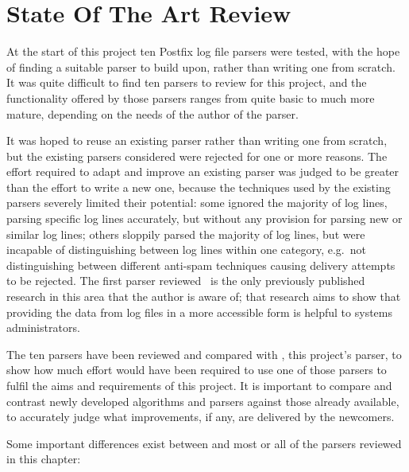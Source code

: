 \chapter{State Of The Art Review}

\label{state of the art review}

At the start of this project ten Postfix log file parsers were tested, with
the hope of finding a suitable parser to build upon, rather than writing
one from scratch.  It was quite difficult to find ten parsers to review for
this project, and the functionality offered by those parsers ranges from
quite basic to much more mature, depending on the needs of the author of
the parser.

It was hoped to reuse an existing parser rather than writing one from
scratch, but the existing parsers considered were rejected for one or more
reasons.  The effort required to adapt and improve an existing parser was
judged to be greater than the effort to write a new one, because the
techniques used by the existing parsers severely limited their potential:
some ignored the majority of log lines, parsing specific log lines
accurately, but without any provision for parsing new or similar log lines;
others sloppily parsed the majority of log lines, but were incapable of
distinguishing between log lines within one category, e.g.\ not
distinguishing between different anti-spam techniques causing delivery
attempts to be rejected.  The first parser
reviewed~\cite{log-mail-analyser} is the only previously published research
in this area that the author is aware of; that research aims to show that
providing the data from log files in a more accessible form is helpful to
systems administrators.

The ten parsers have been reviewed and compared with \parsername{}, this
project's parser, to show how much effort would have been required to use
one of those parsers to fulfil the aims and requirements of this project.
It is important to compare and contrast newly developed algorithms and
parsers against those already available, to accurately judge what
improvements, if any, are delivered by the newcomers.

Some important differences exist between \parsername{} and most or all of
the parsers reviewed in this chapter:

